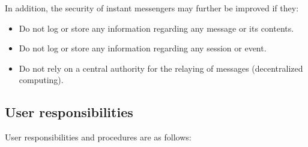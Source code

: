 In addition, the security of instant messengers may further be improved if they:

\begin{itemize}
    \item Do not log or store any information regarding any message or its contents.
    \item Do not log or store any information regarding any session or event.
    \item Do not rely on a central authority for the relaying of messages (decentralized computing).
\end{itemize}

\subsection{User responsibilities}\label{subsec:user-responsibilities}
User responsibilities and procedures are as follows:

